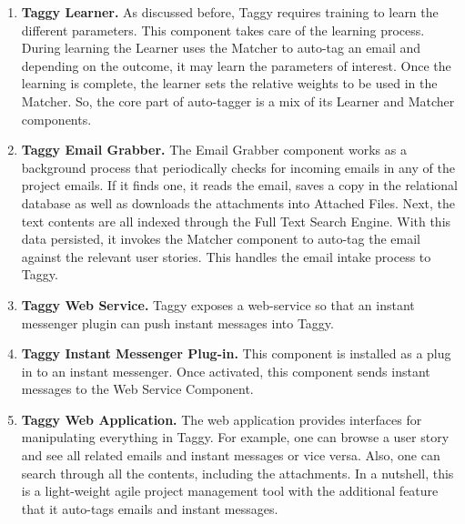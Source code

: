 \begin{enumerate}
	\item \textbf{Taggy Learner.} As discussed before, Taggy requires training to learn the different parameters. This component takes care of the learning process. During learning the Learner uses the Matcher to auto-tag an email and depending on the outcome, it may learn the parameters of interest. Once the learning is complete, the learner sets the relative weights to be used in the Matcher. So, the core part of auto-tagger is a mix of its Learner and Matcher components.
	
	\item \textbf{Taggy Email Grabber.} The Email Grabber component works as a background process that periodically checks for incoming emails in any of the project emails. If it finds one, it reads the email, saves a copy in the relational database as well as downloads the attachments into Attached Files. Next, the text contents are all indexed through the Full Text Search Engine. With this data persisted, it invokes the Matcher component to auto-tag the email against the relevant user stories. This handles the email intake process to Taggy.
	
	\item \textbf{Taggy Web Service.} Taggy exposes a web-service so that an instant messenger plugin can push instant messages into Taggy.
	
	\item \textbf{Taggy Instant Messenger Plug-in.} This component is installed as a plug in to an instant messenger. Once activated, this component sends instant messages to the Web Service Component.
	
	\item \textbf{Taggy Web Application.} The web application provides interfaces for manipulating everything in Taggy. For example, one can browse a user story and see all related emails and instant messages or vice versa. Also, one can search through all the contents, including the attachments. In a nutshell, this is a light-weight agile project management tool with the additional feature that it auto-tags emails and instant messages.
\end{enumerate}

